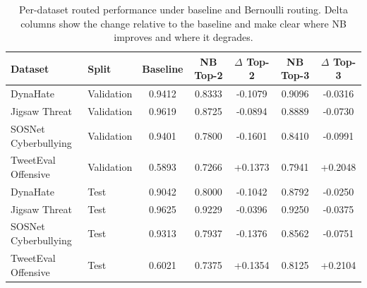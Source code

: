 \begin{table}[t]
\centering
\caption{Per-dataset routed performance under baseline and Bernoulli routing. Delta columns show the change relative to the baseline and make clear where NB improves and where it degrades.}
\begin{tabular}{llccccc}
\toprule
Dataset & Split & Baseline & NB Top-2 & $\Delta$ Top-2 & NB Top-3 & $\Delta$ Top-3 \\
\midrule
DynaHate & Validation & 0.9412 & 0.8333 & -0.1079 & 0.9096 & -0.0316 \\
Jigsaw Threat & Validation & 0.9619 & 0.8725 & -0.0894 & 0.8889 & -0.0730 \\
SOSNet Cyberbullying & Validation & 0.9401 & 0.7800 & -0.1601 & 0.8410 & -0.0991 \\
TweetEval Offensive & Validation & 0.5893 & 0.7266 & +0.1373 & 0.7941 & +0.2048 \\
DynaHate & Test & 0.9042 & 0.8000 & -0.1042 & 0.8792 & -0.0250 \\
Jigsaw Threat & Test & 0.9625 & 0.9229 & -0.0396 & 0.9250 & -0.0375 \\
SOSNet Cyberbullying & Test & 0.9313 & 0.7937 & -0.1376 & 0.8562 & -0.0751 \\
TweetEval Offensive & Test & 0.6021 & 0.7375 & +0.1354 & 0.8125 & +0.2104 \\
\bottomrule
\end{tabular}
\end{table}
